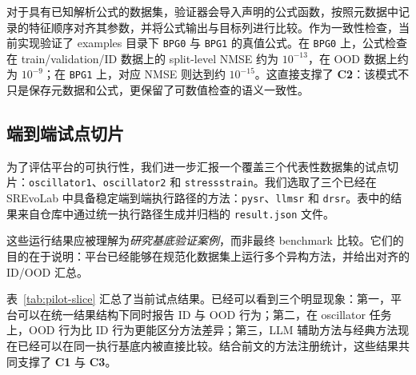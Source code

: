 \documentclass[UTF8]{ctexart}
\begin{document}
对于具有已知解析公式的数据集，验证器会导入声明的公式函数，按照元数据中记录的特征顺序对齐其参数，并将公式输出与目标列进行比较。作为一致性检查，当前实现验证了 examples 目录下 \texttt{BPG0} 与 \texttt{BPG1} 的真值公式。在 \texttt{BPG0} 上，公式检查在 train/validation/ID 数据上的 split-level NMSE 约为 $10^{-13}$，在 OOD 数据上约为 $10^{-9}$；在 \texttt{BPG1} 上，对应 NMSE 则达到约 $10^{-15}$。这直接支撑了 \textbf{C2}：该模式不只是保存元数据和公式，更保留了可数值检查的语义一致性。

\subsection{端到端试点切片}

为了评估平台的可执行性，我们进一步汇报一个覆盖三个代表性数据集的试点切片：\texttt{oscillator1}、\texttt{oscillator2} 和 \texttt{stressstrain}。我们选取了三个已经在 SREvoLab 中具备稳定端到端执行路径的方法：\texttt{pysr}、\texttt{llmsr} 和 \texttt{drsr}。表中的结果来自仓库中通过统一执行路径生成并归档的 \texttt{result.json} 文件。

这些运行结果应被理解为\emph{研究基底验证案例}，而非最终 benchmark 比较。它们的目的在于说明：平台已经能够在规范化数据集上运行多个异构方法，并给出对齐的 ID/OOD 汇总。

表~\ref{tab:pilot-slice} 汇总了当前试点结果。已经可以看到三个明显现象：第一，平台可以在统一结果结构下同时报告 ID 与 OOD 行为；第二，在 oscillator 任务上，OOD 行为比 ID 行为更能区分方法差异；第三，LLM 辅助方法与经典方法现在已经可以在同一执行基底内被直接比较。结合前文的方法注册统计，这些结果共同支撑了 \textbf{C1} 与 \textbf{C3}。
\end{document}

